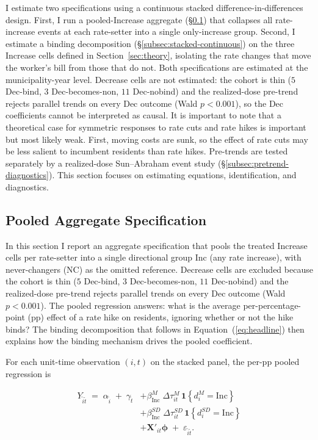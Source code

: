 \documentclass[12pt]{article}
\begin{document}
I estimate two specifications using a continuous stacked
difference-in-differences design. First, I run a pooled-Increase
aggregate (\S\ref{subsec:pooled-spec}) that collapses all
rate-increase events at each rate-setter into a single only-increase
group. Second, I estimate a binding
decomposition (\S\ref{subsec:stacked-continuous}) on the three
Increase cells defined in
Section~\ref{sec:theory}, isolating the rate changes that move the
worker's bill from those that do not. Both specifications are
estimated at the municipality-year level. Decrease cells are not estimated: the cohort is
thin ($5$ Dec-bind, $3$ Dec-becomes-non, $11$ Dec-nobind) and the
realized-dose pre-trend rejects parallel trends on every Dec outcome
(Wald $p<0.001$), so the Dec coefficients cannot be interpreted as
causal. It is important to note that a theoretical case for symmetric responses to
rate cuts and rate hikes is important but most likely weak. First, moving costs are
sunk, so the effect of rate cuts may be less salient to incumbent residents
than rate hikes. Pre-trends are tested
separately by a realized-dose Sun--Abraham event study
(\S\ref{subsec:pretrend-diagnostics}). This section focuses on
estimating equations, identification, and diagnostics.


\subsection{Pooled Aggregate Specification}
\label{subsec:pooled-spec}

In this section I report an aggregate specification that pools the
treated Increase cells per rate-setter into a single directional group
$\text{Inc}$ (any rate increase), with never-changers (NC) as the omitted reference. Decrease cells
are excluded because the cohort is
thin ($5$ Dec-bind, $3$ Dec-becomes-non, $11$ Dec-nobind) and the
realized-dose pre-trend rejects parallel trends on every Dec outcome
(Wald $p<0.001$). The pooled
regression answers: what is the average per-percentage-point (pp)
effect of a rate hike on residents, ignoring whether or not the
hike binds? The binding decomposition that follows in
Equation~(\ref{eq:headline}) then explains how the binding mechanism drives the pooled coefficient.

For each unit-time observation $(i, t)$ on the stacked panel, the
per-pp pooled regression is

\begin{equation}
\begin{split}
Y_{\tilde i \tilde t} \;=\; \alpha_{\tilde i} \;+\; \gamma_{\tilde t}
&+ \beta^{M}_{\text{Inc}}\;\Delta\tau^{M}_{it}\,\mathbf{1}\!\left\{d^{M}_{i} = \text{Inc}\right\} \\
&+ \beta^{SD}_{\text{Inc}}\;\Delta\tau^{SD}_{it}\,\mathbf{1}\!\left\{d^{SD}_{i} = \text{Inc}\right\} \\
&+ \mathbf{X}'_{it}\boldsymbol{\phi}
\;+\; \varepsilon_{\tilde i \tilde t}.
\end{split}
\label{eq:pooled}
\end{equation}
\end{document}
